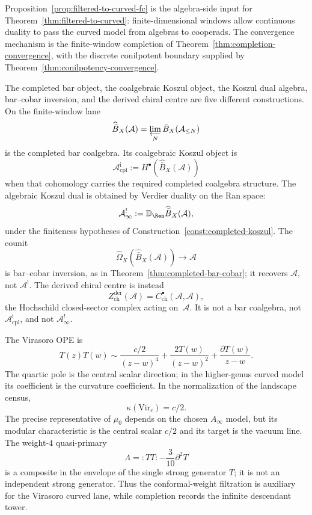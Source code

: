 \begin{remark}
Proposition~\ref{prop:filtered-to-curved-fc} is the algebra-side input
for Theorem~\ref{thm:filtered-to-curved}: finite-dimensional windows
allow continuous duality to pass the curved model from algebras to
cooperads.  The convergence mechanism is the finite-window completion
of Theorem~\ref{thm:completion-convergence}, with the discrete
conilpotent boundary supplied by
Theorem~\ref{thm:conilpotency-convergence}.
\end{remark}

\begin{remark}\label{rem:filtered-curved-object-firewall}
The completed bar object, the coalgebraic Koszul object, the Koszul
dual algebra, bar--cobar inversion, and the derived chiral centre are
five different constructions.
On the finite-window lane
\[
\widehat{\bar B}_X(\mathcal A)
=\varprojlim_N\bar B_X(\mathcal A_{\le N})
\]
is the completed bar coalgebra.  Its coalgebraic Koszul object is
\[
\mathcal A^{\mathrm i}_{\mathrm{cpl}}
:=H^\bullet(\widehat{\bar B}_X(\mathcal A))
\]
when that cohomology carries the required completed coalgebra
structure. The algebraic Koszul dual is obtained by Verdier duality
on the Ran space:
\[
\mathcal A^!_\infty
:=\mathbb D_{\Ran}\widehat{\bar B}_X(\mathcal A),
\]
under the finiteness hypotheses of
Construction~\ref{const:completed-koszul}.  The counit
\[
\widehat\Omega_X(\widehat{\bar B}_X(\mathcal A))\longrightarrow
\mathcal A
\]
is bar--cobar inversion, as in
Theorem~\ref{thm:completed-bar-cobar}; it recovers $\mathcal A$, not
$\mathcal A^!$.  The derived chiral centre is instead
\[
Z^{\mathrm{der}}_{\mathrm{ch}}(\mathcal A)
=C^\bullet_{\mathrm{ch}}(\mathcal A,\mathcal A),
\]
the Hochschild closed-sector complex acting on~$\mathcal A$.  It is not a bar
coalgebra, not $\mathcal A^{\mathrm i}_{\mathrm{cpl}}$, and not
$\mathcal A^!_\infty$.
\end{remark}

\begin{example}\label{ex:vir-filtered-to-curved-fc}
The Virasoro OPE is
\[
T(z)T(w)\sim
\frac{c/2}{(z-w)^4}
+\frac{2T(w)}{(z-w)^2}
+\frac{\partial T(w)}{z-w}.
\]
The quartic pole is the central scalar direction; in the higher-genus
curved model its coefficient is the curvature coefficient.  In the
normalization of the landscape census,
\[
\kappa(\mathrm{Vir}_c)=c/2.
\]
The precise representative of $\mu_0$ depends on the chosen
$A_\infty$ model, but its modular characteristic is the central scalar
$c/2$ and its target is the vacuum line.  The weight-$4$ quasi-primary
\[
\Lambda={:}TT{:}-\frac{3}{10}\partial^2T
\]
is a composite in the envelope of the single strong generator $T$; it
is not an independent strong generator.  Thus the conformal-weight
filtration is auxiliary for the Virasoro curved lane, while completion
records the infinite descendant tower.
\end{example}

